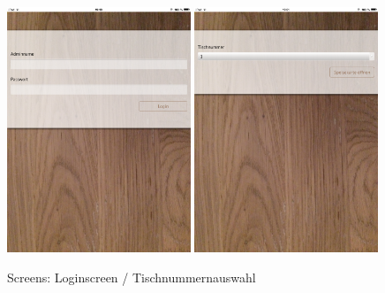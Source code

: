 			\begin{figure}[H]
			\begin{centering}
			\includegraphics[width = 0.49\textwidth]{Bilder/Jok_login.png}
			\includegraphics[width = 0.49\textwidth]{Bilder/Jok_tnr.png}
			\par\end{centering}
			\caption{Screens: Loginscreen / Tischnummernauswahl}
			\label{Screens: Loginscreen / Tischnummernauswahl}
			\end{figure}
			
